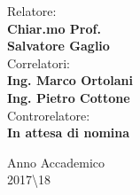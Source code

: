 \documentclass[12pt, oneside]{book}
\theoremstyle{definition}
\theoremstyle{plain}
\begin{document}
\begin{titlepage}
\begin{minipage}[t]{0.70\textwidth}
{}
\end{minipage}
\begin{minipage}[t]{0.47\textwidth}\raggedright
{\large Relatore:\\
\vspace{3mm}
\textbf{Chiar.mo Prof.}\\ \textbf{Salvatore Gaglio}\\
\vspace{5mm}
Correlatori:\\
\vspace{3mm}
\textbf{Ing. Marco Ortolani}\\
\vspace{3mm}
\textbf{Ing. Pietro Cottone}\\
\vspace{5mm}
Controrelatore:\\
\vspace{3mm}
\textbf {In attesa di nomina}\\
}
\end{minipage}
\hfill
\vspace{7mm}
\begin{center}
{\large Anno Accademico\\2017\textbackslash18 }%
\end{center}
\end{titlepage}


\frontmatter %

\tableofcontents
\listoffigures
\listoftables






\end{document}
